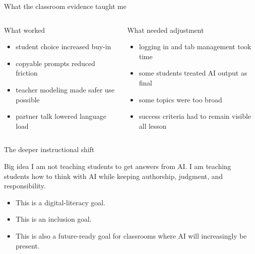 \documentclass[aspectratio=169,11pt]{beamer}
\newcommand{\bigidea}[1]{
  \begin{block}{Big idea}
  \Large #1
  \end{block}
}
\begin{document}
\begin{frame}{What the classroom evidence taught me}
\begin{columns}[T]
  \begin{block}{What worked}
  \begin{itemize}
    \item student choice increased buy-in
    \item copyable prompts reduced friction
    \item teacher modeling made safer use possible
    \item partner talk lowered language load
  \end{itemize}
  \end{block}

  \begin{block}{What needed adjustment}
  \begin{itemize}
    \item logging in and tab management took time
    \item some students treated AI output as final
    \item some topics were too broad
    \item success criteria had to remain visible all lesson
  \end{itemize}
  \end{block}
\end{columns}
\end{frame}

\begin{frame}{The deeper instructional shift}
\bigidea{I am not teaching students to get answers from AI. I am teaching students how to think with AI while keeping authorship, judgment, and responsibility.}

\vspace{0.2cm}
\begin{itemize}
  \item This is a digital-literacy goal.
  \item This is an inclusion goal.
  \item This is also a future-ready goal for classrooms where AI will increasingly be present.
\end{itemize}
\end{frame}
\end{document}
